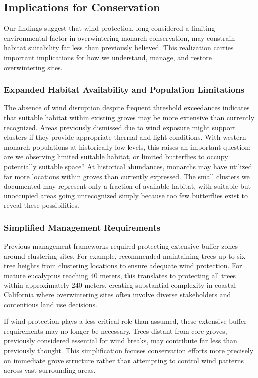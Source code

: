 \subsection{Implications for Conservation}

Our findings suggest that wind protection, long considered a limiting environmental factor in overwintering monarch conservation, may constrain habitat suitability far less than previously believed. This realization carries important implications for how we understand, manage, and restore overwintering sites.

\subsubsection{Expanded Habitat Availability and Population Limitations}

The absence of wind disruption despite frequent threshold exceedances indicates that suitable habitat within existing groves may be more extensive than currently recognized. Areas previously dismissed due to wind exposure might support clusters if they provide appropriate thermal and light conditions. With western monarch populations at historically low levels, this raises an important question: are we observing limited suitable habitat, or limited butterflies to occupy potentially suitable space? At historical abundances, monarchs may have utilized far more locations within groves than currently expressed. The small clusters we documented may represent only a fraction of available habitat, with suitable but unoccupied areas going unrecognized simply because too few butterflies exist to reveal these possibilities.

\subsubsection{Simplified Management Requirements}

Previous management frameworks required protecting extensive buffer zones around clustering sites. For example, \textcite{althouse&meadeinc.EllwoodMesaSperling2023} recommended maintaining trees up to six tree heights from clustering locations to ensure adequate wind protection. For mature eucalyptus reaching 40 meters, this translates to protecting all trees within approximately 240 meters, creating substantial complexity in coastal California where overwintering sites often involve diverse stakeholders and contentious land use decisions.

If wind protection plays a less critical role than assumed, these extensive buffer requirements may no longer be necessary. Trees distant from core groves, previously considered essential for wind breaks, may contribute far less than previously thought. This simplification focuses conservation efforts more precisely on immediate grove structure rather than attempting to control wind patterns across vast surrounding areas.

